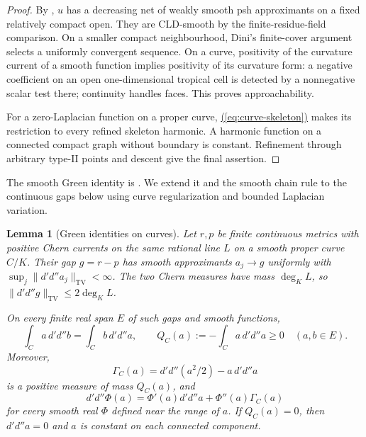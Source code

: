 \documentclass[11pt]{amsart}
\newtheorem{lemma}[theorem]{Lemma}
\theoremstyle{definition}
\theoremstyle{remark}
\numberwithin{equation}{section}
\newcommand{\ddc}{d'd''}
\renewcommand{\eqref}[1]{%
 \begingroup\hypersetup{linkcolor=equationviolet}%
 \hyperref[#1]{\textup{(\ref*{#1})}}%
 \endgroup}
\newcommand{\TV}{\mathrm{TV}}
\begin{document}
\begin{proof}
By \cite[Proposition 15.11]{GJRforms}, \(u\) has a decreasing net
of weakly smooth psh approximants on a fixed relatively compact
open. They are CLD-smooth by the finite-residue-field comparison.
On a smaller compact neighbourhood, Dini's finite-cover argument
selects a uniformly convergent sequence. On a curve, positivity of
the curvature current of a smooth function implies positivity of
its curvature form: a negative coefficient on an open
one-dimensional tropical cell is detected by a nonnegative scalar
test there; continuity handles faces. This proves approachability.

For a zero-Laplacian function on a proper curve,
\eqref{eq:curve-skeleton} makes its restriction to every refined
skeleton harmonic. A harmonic function on a connected compact
graph without boundary is constant. Refinement through arbitrary
type-II points and descent give the final assertion.
\end{proof}

The smooth Green identity is \cite[Theorem 3.12.2]{CLD12}.
We extend it and the smooth chain rule to the continuous gaps
below using curve regularization and bounded Laplacian variation.

\begin{lemma}[Green identities on curves]\label{lem:curve-green}
Let \(r,p\) be finite continuous metrics with positive Chern currents
on the same rational line \(L\) on a smooth proper curve \(C/K\).
Their gap \(g=r-p\) has smooth approximants \(a_j\to g\) uniformly
with \(\sup_j\|\ddc a_j\|_{\TV}<\infty\). The two Chern measures
have mass \(\deg_KL\), so \(\|\ddc g\|_{\TV}\leq2\deg_KL\).

On every finite real span \(E\) of such gaps and smooth functions,
\begin{equation}\label{eq:curve-green}
 \int_C a\,\ddc b=\int_C b\,\ddc a,\qquad
 Q_C(a):=-\int_C a\,\ddc a\geq0 \quad(a,b\in E).
\end{equation}
Moreover,
\[
 \Gamma_C(a)=\ddc(a^2/2)-a\,\ddc a
\]
is a positive measure of mass \(Q_C(a)\), and
\[
 \ddc\Phi(a)=\Phi'(a)\ddc a+\Phi''(a)\Gamma_C(a)
\]
for every smooth real \(\Phi\) defined near the range of \(a\).
If \(Q_C(a)=0\), then \(\ddc a=0\) and \(a\) is constant on each
connected component.
\end{lemma}
\end{document}
